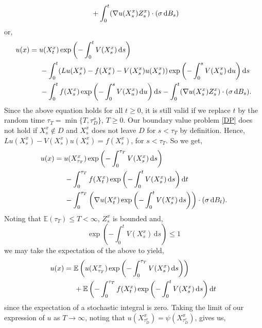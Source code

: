 \documentclass[a4paper,12pt,draft]{report}
\begin{document}
{\begin{align}
& \hspace{0.5cm} + \int_0^t(\nabla u(X_s^x)Z_s^x)\cdot(\sigma\,\mathrm{d}B_s)\nonumber
\end{align}
or,
\begin{align}
u(x) & = u(X_t^x)\exp\left(-\int_0^tV(X_s^x)\,\mathrm{d}s\right)\nonumber\\
& \hspace{0.5cm} - \int_0^t(Lu(X_s^x) - f(X_s^x) - V(X_s^x)u(X_s^x))\exp\left(-\int_0^sV(X_u^x)\,\mathrm{d}u\right)\mathrm{d}s\nonumber\\
& \hspace{0.5cm} - \int_0^tf(X_s^x)\exp\left(-\int_0^sV(X_u^x)\,\mathrm{d}u\right)\mathrm{d}s - \int_0^t(\nabla u(X_s^x)Z_s^x)\cdot(\sigma\,\mathrm{d}B_s).\nonumber
\end{align}
Since the above equation holds for all $t \ge 0$, it is still valid if we replace $t$ by the random time $\tau_T = \min\{T, \tau_D^x\}$, $T \ge 0$.  Our boundary value problem \eqref{DP} does not hold if $X_s^x \notin D$ and  $X_s^x$ does not leave $D$ for $s < \tau_T$ by definition.  Hence, $Lu(X_s^x) - V(X_s^x)u(X_s^x) = f(X_s^x)$,  for $s < \tau_T$.  So we get,
\begin{align}
u(x) & = u(X_{\tau_T}^x)\exp\left(-\int_0^{\tau_T}V(X_s^x)\,\mathrm{d}s\right)\nonumber\\
& \hspace{0.5cm} - \int_0^{\tau_T}f(X_t^x)\exp\left(-\int_0^tV(X_s^x)\,\mathrm{d}s\right)\mathrm{d}t\nonumber\\
& \hspace{0.5cm} - \int_0^{\tau_T}\left(\nabla u(X_t^x)\exp\left(-\int_0^tV(X_s^x)\,\mathrm{d}s\right)\right)\cdot(\sigma\,\mathrm{d}B_t).\nonumber
\end{align}
Noting that $\mathbb{E}(\tau_T) \le T < \infty$, $Z_s^x$ is bounded and,
$$
\exp\left(-\int_0^tV(X_s^x)\,\mathrm{d}s\right) \le 1
$$
we may take the expectation of the above to yield,
\begin{align}
u(x) & = \mathbb{E}\left(u(X_{\tau_T}^x)\exp\left(-\int_0^{\tau_T}V(X_s^x)\,\mathrm{d}s\right)\right)\nonumber\\
& \hspace{0.5cm} + \mathbb{E}\left(-\int_0^{\tau_T}f(X_t^x)\exp\left(-\int_0^tV(X_s^x)\,\mathrm{d}s\right)\mathrm{d}t\right.\nonumber
\end{align}
since the expectation of a stochastic integral is zero.  Taking the limit of our expression of $u$ as $T \to \infty$, noting that $u(X_{\tau_D^x}^x) = \psi(X_{\tau_D^x}^x)$, gives us,
}
\end{document}
